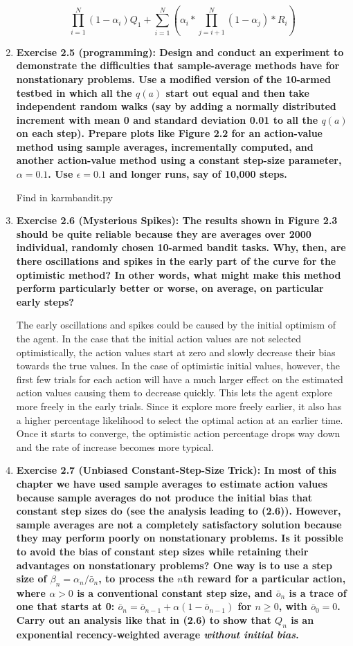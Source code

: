 \documentclass[11pt]{article}
\begin{document}
\begin{enumerate}
		$$\prod_{i=1}^N(1-\alpha_i)Q_1 + \sum_{i=1}^N(\alpha_i * \prod_{j=i+1}^N (1 - \alpha_j) * R_i)$$
		
		\item \textbf{Exercise 2.5 (programming): Design and conduct an experiment to demonstrate the difficulties that sample-average methods have for nonstationary problems. Use
		a modified version of the 10-armed testbed in which all the $q(a)$ start out equal and then take independent random walks (say by adding a normally distributed increment
		with mean 0 and standard deviation 0.01 to all the $q(a)$ on each step). Prepare plots like Figure 2.2 for an action-value method using sample averages, incrementally
		computed, and another action-value method using a constant step-size parameter, $\alpha=0.1$. Use $\epsilon=0.1$ and longer runs, say of 10,000 steps.}
		
		Find in karmbandit.py
		
		\item \textbf{Exercise 2.6 (Mysterious Spikes): The results shown in Figure 2.3 should be quite reliable because they are averages over 2000 individual, randomly chosen
		10-armed bandit tasks. Why, then, are there oscillations and spikes in the early part of the curve for the optimistic method? In other words, what might make this method
		perform particularly better or worse, on average, on particular early steps?}
		
		The early oscillations and spikes could be caused by the initial optimism of the agent. In the case that the initial action values are not selected optimistically, the
		action values start at zero and slowly decrease their bias towards the true values. In the case of optimistic initial values, however, the first few trials for each action
		will have a much larger effect on the estimated action values causing them to decrease quickly. This lets the agent explore more freely in the early trials. Since it
		explore more freely earlier, it also has a higher percentage likelihood to select the optimal action at an earlier time. Once it starts to converge, the optimistic action
		percentage drops way down and the rate of increase becomes more typical.
		
		\item \textbf{Exercise 2.7 (Unbiased Constant-Step-Size Trick): In most of this chapter we have used sample averages to estimate action values because sample averages do
		not produce the initial bias that constant step sizes do (see the analysis leading to (2.6)). However, sample averages are not a completely satisfactory solution because
		they may perform poorly on nonstationary problems. Is it possible to avoid the bias of constant step sizes while retaining their advantages on nonstationary problems? One
		way is to use a step size of $\beta_n=\alpha_n/\bar{o}_n$, to process the $n$th reward for a particular action, where $\alpha>0$ is a conventional constant step size, and
		$\bar{o}_n$ is a trace of one that starts at 0: $\bar{o}_n=\bar{o}_{n-1}+\alpha(1-\bar{o}_{n-1})$ for $n\geq0$, with $\bar{o}_0=0$. Carry out an analysis like that in
		(2.6) to show that $Q_n$ is an exponential recency-weighted average \textit{without initial bias}.}
		

\end{enumerate}
\end{document}
